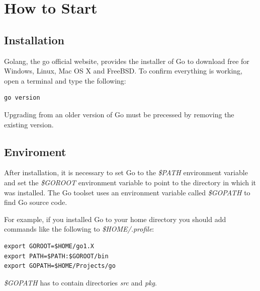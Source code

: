 \documentclass[
  twoside, 12pt, 
  printed, %
  notable,   %
  lof,     %
  lot,     %
]{fithesis3}
\begin{document}
\section{How to Start}\label{howToStart}
\subsection{Installation}
Golang, the go official website, provides the installer of Go to download free for Windows, 
Linux, Mac OS X and FreeBSD. To confirm everything is working, open a terminal and 
type the following:
\begin{lstlisting}
go version
\end{lstlisting}
Upgrading from an older version of Go must be precessed by removing the existing version. 

\subsection{Enviroment}
After installation, it is necessary to set Go to the \textit{\$PATH} environment variable and set the \textit{\$GOROOT} environment variable to point to the directory in which it was installed. The Go toolset uses an environment variable called \textit{\$GOPATH} to find Go source code. 

For example, if you installed Go to your home directory you should add commands like the following to \textit{\$HOME/.profile}:
\begin{lstlisting}
export GOROOT=$HOME/go1.X
export PATH=$PATH:$GOROOT/bin
export GOPATH=$HOME/Projects/go
\end{lstlisting}
\textit{\$GOPATH} has to contain directories \textit{src} and \textit{pkg}.

\end{document}
